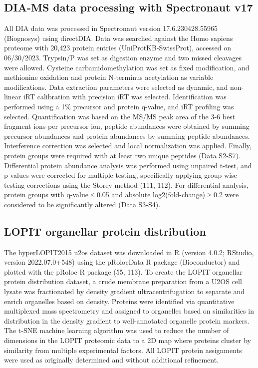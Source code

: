 \begin{refsection}
    \subsection{DIA-MS data processing with Spectronaut v17}
    All DIA data was processed in Spectronaut version 17.6.230428.55965 (Biognosys) using directDIA. Data was searched against the Homo sapiens proteome with 20,423 protein entries (UniProtKB-SwissProt), accessed on 06/30/2023. Trypsin/P was set as digestion enzyme and two missed cleavages were allowed. Cysteine carbamidomethylation was set as fixed modification, and methionine oxidation and protein N-terminus acetylation as variable modifications. Data extraction parameters were selected as dynamic, and non-linear iRT calibration with precision iRT was selected. Identification was performed using a 1\% precursor and protein q-value, and iRT profiling was selected. Quantification was based on the MS/MS peak area of the 3-6 best fragment ions per precursor ion, peptide abundances were obtained by summing precursor abundances and protein abundances by summing peptide abundances. Interference correction was selected and local normalization was applied. Finally, protein groups were required with at least two unique peptides (Data S2-S7). Differential protein abundance analysis was performed using unpaired t-test, and p-values were corrected for multiple testing, specifically applying group-wise testing corrections using the Storey method (111, 112). For differential analysis, protein groups with q-value ≤ 0.05 and absolute log2(fold-change) ≥ 0.2 were considered to be significantly altered (Data S3-S4).
    
    \subsection{LOPIT organellar protein distribution}
    The hyperLOPIT2015 u2os dataset was downloaded in R (version 4.0.2; RStudio, version 2022.07.0+548) using the pRolocData R package (Bioconductor) and plotted with the pRoloc R package (55, 113). To create the LOPIT organellar protein distribution dataset, a crude membrane preparation from a U2OS cell lysate was fractionated by density gradient ultracentrifugation to separate and enrich organelles based on density\cite{thul1979a,dunkley2004a,mulvey2017a}. Proteins were identified via quantitative multiplexed mass spectrometry and assigned to organelles based on similarities in distribution in the density gradient to well-annotated organelle protein markers. The t-SNE machine learning algorithm was used to reduce the number of dimensions in the LOPIT proteomic data to a 2D map where proteins cluster by similarity from multiple experimental factors\cite{meier2020a}. All LOPIT protein assignments were used as originally determined and without additional refinement.
    

\end{refsection}
